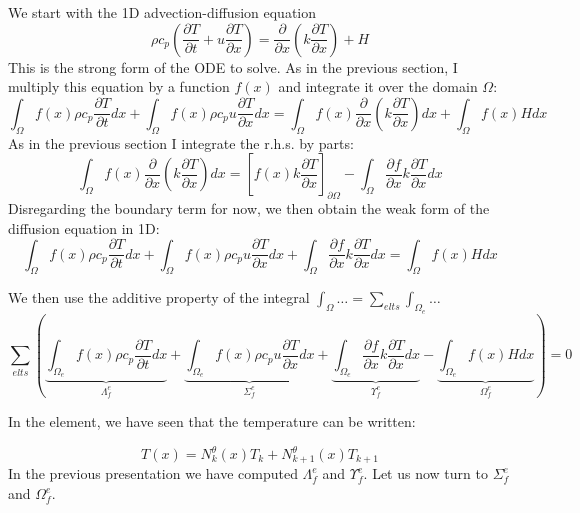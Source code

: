 
We start with the 1D advection-diffusion equation
\begin{equation}
\rho c_p \left( \frac{\partial T}{\partial t} 
+ u \frac{\partial T}{\partial x}
\right)
= \frac{\partial }{\partial x} \left( k \frac{\partial T}{\partial x}  \right)
+H
\end{equation}
This is the {\color{olive}strong form} of the ODE to solve.
As in the previous section, I multiply this equation by a function $f(x)$ and integrate it over 
the domain $\Omega$:
\[
\int_{\Omega} f(x)  \rho c_p\frac{\partial T}{\partial t} dx
+
\int_{\Omega} f(x)  \rho c_p u \frac{\partial T}{\partial x} dx
\!=\!
\int_{\Omega} f(x) \frac{\partial }{\partial x}\! \left(\! k\! \frac{\partial T}{\partial x}\!  \right)\! dx
+
\int_{\Omega} f(x) H dx 
\]
As in the previous section I integrate the r.h.s. by parts:
\[
\int_{\Omega} f(x) \frac{\partial }{\partial x} \left( k \frac{\partial T}{\partial x}  \right) dx
=
\left[
f(x) k \frac{\partial T}{\partial x}
\right]_{\partial \Omega}
-
\int_{\Omega} \frac{\partial f}{\partial x}  k \frac{\partial T}{\partial x}  dx
\]
Disregarding the boundary term for now, 
we then obtain the {\color{olive}weak form} of the diffusion equation in 1D:
\[
\boxed{
\int_{\Omega} f(x) \rho c_p \frac{\partial T}{\partial t} dx
+
\int_{\Omega} f(x)  \rho c_p u \frac{\partial T}{\partial x} dx
+
\int_{\Omega} \frac{\partial f}{\partial x}  k \frac{\partial T}{\partial x}  dx = 
\int_{\Omega} f(x) H dx 
}
\]

We then use the additive property of the integral $\int_\Omega \dots = \sum_{elts} \int_{\Omega_e} \dots$
\[
\sum_{elts} \left(     
\underbrace{ \int_{\Omega_e} f(x) \rho c_p   \frac{\partial T}{\partial t} dx }_{{\Lambda}_f^e}
+
\underbrace{  \int_{\Omega_e} f(x)  \rho c_p u \frac{\partial T}{\partial x} dx  }_{{\Sigma}_f^e}
+
\underbrace{\int_{\Omega_e} \frac{\partial f}{\partial x}  k \frac{\partial T}{\partial x}  dx}_{{\Upsilon}_f^e}    
- 
\underbrace{\int_{\Omega_e} f(x) H dx }_{{\Omega}_f^e}
  \right) = 0  
\]

In the element, we have seen that the temperature can be written:

\[
T(x) 
= N^\theta_{k}(x) T_k + N^\theta_{k+1}(x) T_{k+1}  
\]
In the previous presentation we have computed  ${\Lambda}_f^e$ and ${\Upsilon}_f^e$.
Let us now turn to ${\Sigma}_f^e$ and ${\Omega}_f^e$.

